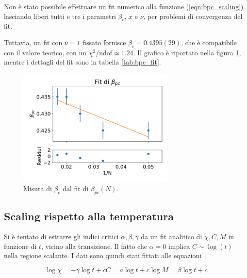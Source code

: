 \documentclass[a4paper,11pt]{article}
\begin{document}
    Non è stato possibile effettuare un fit numerico alla funzione (\ref{eqn:bpc_scaling}) lasciando liberi tutti e tre i parametri $\beta_c$, $x$ e $\nu$, per problemi di convergenza del fit.
    
    Tuttavia, un fit con $\nu = 1$ fissato fornisce $\beta_c = 0.4395(29)$, che è compatibile con il valore teorico, con un $\chi^2 / \text{ndof} \simeq 1.24$. Il grafico è riportato nella figura \ref{fig:bpc_fit}, mentre i dettagli del fit sono in tabella \ref{tab:bpc_fit}.
    
    \begin{figure}
        \centering
        \includegraphics[width=0.7\textwidth]{figure/fit_bpc.pdf}
        \caption{Misura di $\beta_c$ dal fit di $\beta_{pc}(N)$.}
        \label{fig:bpc_fit}
    \end{figure}
    



	
	\subsection{Scaling rispetto alla temperatura}
	
	Si è tentato di estrarre gli indici critici $\alpha, \beta, \gamma$ da un fit analitico di $\chi, C, M$ in funzione di $t$, vicino alla transizione.
	Il fatto che $\alpha = 0$ implica $C \sim \log(t)$ nella regione scalante. I dati sono quindi stati fittati alle equazioni
	
	\begin{subequations}
        \begin{equation}
            \log \chi = - \gamma \log t + c
        \end{equation}
         \begin{equation}
            C = a \log t + c
        \end{equation}  
        \begin{equation}
            \log M = \beta \log t + c
        \end{equation}
	\end{subequations}
\end{document}
